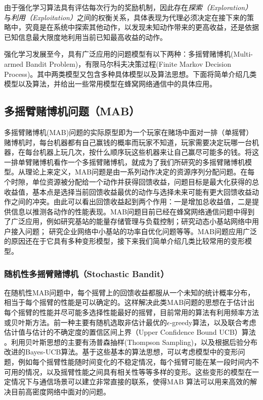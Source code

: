 \documentclass{IEEEtran}
\begin{document}
由于强化学习算法具有评估每次行为的奖励机制，因此存在\emph{探索（Exploration）}与\emph{利用（Exploitation）}之间的权衡关系，具体表现为代理必须决定在接下来的策略中，究竟是在系统中探索其他动作，以发现未知动作带来的更高收益，还是依据已知信息最大限度地利用当前已知最高收益的动作。

强化学习发展至今，具有广泛应用的问题模型有以下两种：多摇臂赌博机(Multi-armed Bandit Problem)，有限马尔科夫决策过程(Finite Markov Decision Process)。其中两类模型又包含多种具体模型以及算法思想。下面将简单介绍几类模型以及算法，并给出一些常用模型在蜂窝网络通信中的具体应用。


\subsection{多摇臂赌博机问题（MAB）}
多摇臂赌博机(MAB)问题的实际原型即为一个玩家在赌场中面对一排（单摇臂）赌博机时，每台机器都有自己赢钱的概率而玩家不知道，玩家需要决定玩哪一台机器，在每台机器上玩几次，按什么顺序玩这些机器来让自己赢尽可能多的钱。将这一排单臂赌博机看作一个多摇臂赌博机，就成为了我们所研究的多摇臂赌博机模型。从理论上来定义，MAB问题是由一系列动作决定的资源序列分配问题。在每个时隙，单位资源被分配给一个动作并获得回馈收益，问题目标是最大化获得的总收益值，基本点是选择当前回馈收益最优的动作与选择未来可能有更大回馈收益动作之间的冲突。由此可以看出回馈收益起到两个作用：一是增加总收益值，二是提供信息以推测各动作的性能表现。MAB问题目前已经在蜂窝网络通信问题中得到了广泛应用，例如\cite{Zhang2017}研究基站的能量存储管理与负载控制；\cite{Maghsudi2017}研究动态小基站网络中用户接入问题；\cite{Wang2017} 研究企业网络中小基站的功率自优化问题等等。MAB问题应用广泛的原因还在于它具有多种变形模型，接下来我们简单介绍几类比较常用的变形模型。
\subsubsection{随机性多摇臂赌博机（Stochastic Bandit）}
在随机性MAB问题中，每个摇臂上的回馈收益都服从一个未知的统计概率分布，相当于每个摇臂的性能是可以确定的。这样解决此类MAB问题的思想在于估计出每个摇臂的性能并尽可能多选择性能最好的摇臂，目前常用的算法有利用频率方法或贝叶斯方法。前一种主要有随机选取非估计最优的$\epsilon$-greedy算法\cite{Sutton2016}，以及联合考虑估计值与估计的不确定度的置信区间上界（Upper Confidence Bound UCB）算法       \cite{Auer2002a}。利用贝叶斯思想的主要有汤普森抽样(Thompson Sampling)\cite{Agrawal2012}\cite{Kaufmann2012}，以及根据后验分布改进的Bayes-UCB算法\cite{Kaufmann2012a}。基于这些基本的算法思想，可以考虑模型中的变形问题，例如每个摇臂性能随时间变化的不稳定情况，每个摇臂可能在某一段时间内不可用的情况，以及摇臂性能之间具有相关性等等多样的变形。这些变形的模型在一定情况下与通信场景可以建立非常直接的联系，使得MAB 算法可以用来高效的解决目前高密度网络中面对的问题。
\end{document}
